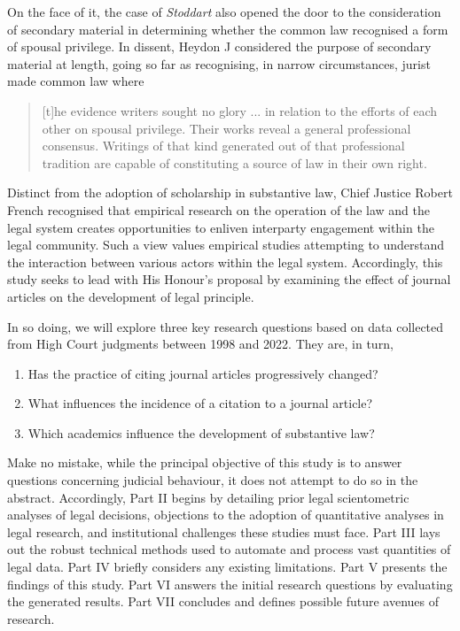 On the face of it, the case of \emph{Stoddart} also opened the door to the consideration of secondary material in determining whether the common law recognised a form of spousal privilege. In dissent, Heydon J considered the purpose of secondary material at length, going so far as recognising, in narrow circumstances, jurist made common law where

\begin{quote}
[t]he evidence writers sought no glory ... in relation to the efforts of each other on spousal privilege. Their works reveal a general professional consensus. Writings of that kind generated out of that professional tradition are capable of constituting a source of law in their own right.
\end{quote}

Distinct from the adoption of scholarship in substantive law, Chief Justice Robert French recognised that empirical research on the operation of the law and the legal system creates opportunities to enliven interparty engagement within the legal community. Such a view values empirical studies attempting to understand the interaction between various actors within the legal system. Accordingly, this study seeks to lead with His Honour's proposal by examining the effect of journal articles on the development of legal principle.

In so doing, we will explore three key research questions based on data collected from High Court judgments between 1998 and 2022. They are, in turn,

\begin{enumerate}
    \item Has the practice of citing journal articles progressively changed?
    \item What influences the incidence of a citation to a journal article?
    \item Which academics influence the development of substantive law?
\end{enumerate}

Make no mistake, while the principal objective of this study is to answer questions concerning judicial behaviour, it does not attempt to do so in the abstract. Accordingly, Part II begins by detailing prior legal scientometric analyses of legal decisions, objections to the adoption of quantitative analyses in legal research, and institutional challenges these studies must face. Part III lays out the robust technical methods used to automate and process vast quantities of legal data. Part IV briefly considers any existing limitations. Part V presents the findings of this study. Part VI answers the initial research questions by evaluating the generated results. Part VII concludes and defines possible future avenues of  research.
